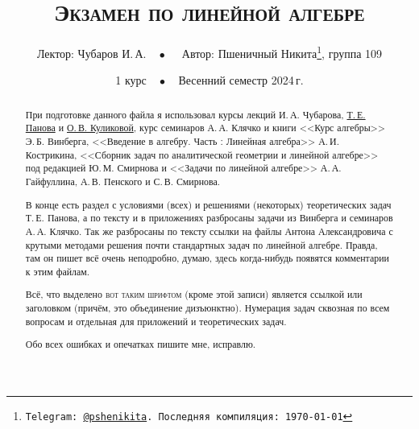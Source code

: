 \documentclass[a4paper, 11pt]{article}
\begin{document}
\title{\bfseries\scshape Экзамен по линейной алгебре}
\date{1 курс$\quad\bullet\quad$Весенний семестр 2024\,г.}
\author{Лектор: Чубаров И.\,А.$\quad\bullet\quad$ Автор: Пшеничный Никита\thanks{\texttt{Telegram: \href{https://t.me/pshenikita}{@pshenikita}. Последняя компиляция: \today}}, группа 109}

\maketitle

\begin{abstract}
    При подготовке данного файла я использовал курсы лекций И.\,А. Чубарова, \href{http://higeom.math.msu.su/people/taras/#teaching}{Т.\,Е. Панова} и \href{http://halgebra.math.msu.su/wiki/lib/exe/fetch.php/28_lectures_02_06_20_.pdf}{О.\,В. Куликовой}, курс семинаров А.\,А. Клячко и книги <<Курс алгебры>> Э.\,Б. Винберга, <<Введение в алгебру. Часть : Линейная алгебра>> А.\,И. Кострикина, <<Сборник задач по аналитической геометрии и линейной алгебре>> под редакцией Ю.\,М. Смирнова и <<Задачи по линейной алгебре>> А.\,А. Гайфуллина, А.\,В. Пенского и С.\,В. Смирнова.

    В конце есть раздел с условиями (всех) и решениями (некоторых) теоретических задач Т.\,Е. Панова, а по тексту и в приложениях разбросаны задачи из Винберга и семинаров А.\,А. Клячко. Так же разбросаны по тексту ссылки на файлы Антона Александровича с крутыми методами решения почти стандартных задач по линейной алгебре. Правда, там он пишет всё очень неподробно, думаю, здесь когда-нибудь появятся комментарии к этим файлам.

    Всё, что выделено {\scshape вот таким шрифтом} (кроме этой записи) является ссылкой или заголовком (причём, это объединение дизъюнктно). Нумерация задач сквозная по всем вопросам и отдельная для приложений и теоретических задач.

    Обо всех ошибках и опечатках пишите мне, исправлю.
\end{abstract}

\tableofcontents

\newpage
\end{document}

